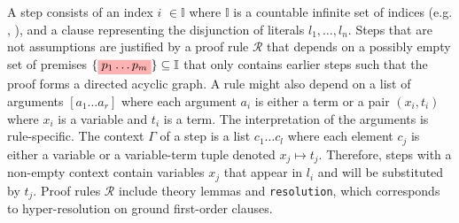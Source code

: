 A step %
consists of an index \colorbox{indexClr!30}{$i$} $\in \mathbb{I}$ where $\mathbb{I}$ is a countable infinite set of indices (e.g. , ), and a clause representing the disjunction of literals \colorbox{green!30}{$l_1, \dots, l_n$}.
Steps that are not assumptions are justified by a proof rule \colorbox{purple!30}{$\mathcal{R}$} that depends on a possibly empty set of premises $\{\colorbox{red!30}{$p_1 \dots  p_m$}\} \subseteq \mathbb{I}$ that only contains earlier steps such that the proof forms
a directed acyclic graph. A rule might also depend on a list of arguments \colorbox{orange!30}{$[a_1 \dots a_r]$} where each argument $a_i$ is either a term or a pair $(x_i, t_i)$ where $x_i$ is a variable and $t_i$ is a term.
The interpretation of the arguments is rule-specific. The context \colorbox{blue!30}{$\Gamma$} of a step is a list $c_1 \dots c_l $ where each element $c_j$ is either a variable or a variable-term tuple denoted $x_j \mapsto t_j$.
Therefore, steps with a non-empty context contain variables $x_j$ that appear in \colorbox{green!30}{$l_i$} and will be substituted by $t_j$. Proof rules \colorbox{purple!30}{$\mathcal{R}$} include theory lemmas and \texttt{resolution}, which corresponds to hyper-resolution on ground first-order clauses.

